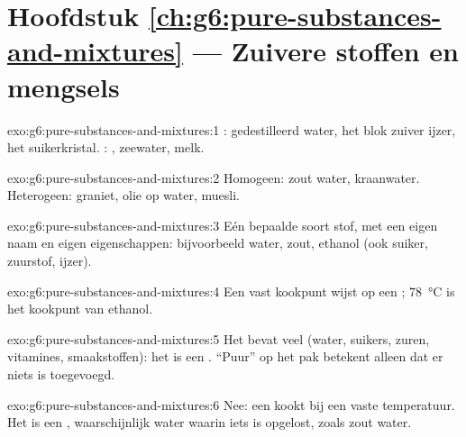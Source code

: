 \section*{Hoofdstuk \ref{ch:g6:pure-substances-and-mixtures} --- Zuivere stoffen en mengsels}

\begin{solution}{exo:g6:pure-substances-and-mixtures:1}
: gedestilleerd water, het blok zuiver ijzer, het
suikerkristal. : , zeewater, melk.
\end{solution}

\begin{solution}{exo:g6:pure-substances-and-mixtures:2}
Homogeen: zout water, kraanwater. Heterogeen: graniet, olie op water,
muesli.
\end{solution}

\begin{solution}{exo:g6:pure-substances-and-mixtures:3}
Eén bepaalde soort stof, met een eigen naam en eigen eigenschappen:
bijvoorbeeld water, zout, ethanol (ook suiker, zuurstof, ijzer).
\end{solution}

\begin{solution}{exo:g6:pure-substances-and-mixtures:4}
Een vast kookpunt wijst op een ; \qty{78}{\celsius} is het
kookpunt van ethanol.
\end{solution}

\begin{solution}{exo:g6:pure-substances-and-mixtures:5}
Het bevat veel  (water, suikers, zuren, vitamines,
smaakstoffen): het is een . ``Puur'' op het pak betekent alleen
dat er niets is toegevoegd.
\end{solution}

\begin{solution}{exo:g6:pure-substances-and-mixtures:6}
Nee: een  kookt bij een vaste temperatuur. Het is een
, waarschijnlijk water waarin iets is opgelost, zoals zout water.
\end{solution}

